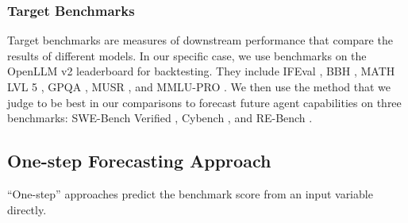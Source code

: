 \subsubsection{Target Benchmarks}
\label{subsec:target_benchmark}

Target benchmarks are measures of downstream performance that compare the results of different models. In our specific case, we use benchmarks on the OpenLLM v2 leaderboard \citep{open-llm-leaderboard-v2} for backtesting. They include IFEval \citep{zhou2023instructionfollowingevaluationlargelanguage}, BBH \citep{suzgun2022challengingbigbenchtaskschainofthought}, MATH LVL 5 \citep{hendrycks2021measuringmathematicalproblemsolving}, GPQA \citep{rein2023gpqagraduatelevelgoogleproofqa}, MUSR \citep{sprague2024musrtestinglimitschainofthought}, and MMLU-PRO \citep{wang2024mmluprorobustchallengingmultitask}. We then use the method that we judge to be best in our comparisons to forecast future agent capabilities on three benchmarks: SWE-Bench Verified \cite{openai2024swebenchverified}, Cybench \cite{zhang2024cybenchframeworkevaluatingcybersecurity}, and RE-Bench \cite{wijk2024rebenchevaluatingfrontierai}.


\subsection{One-step Forecasting Approach}
``One-step'' approaches predict the benchmark score from an input variable directly.

